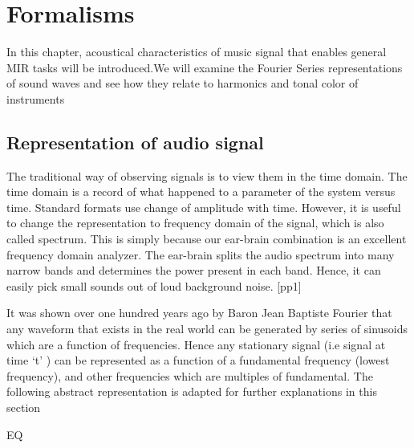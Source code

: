 
\chapter{Formalisms} %

\label{Chapter2} %



In this chapter, acoustical characteristics of music signal that enables general MIR tasks will be introduced.We will examine the Fourier Series representations of sound waves and see how they relate to harmonics and tonal color of instruments  




\section{Representation of audio signal}
The traditional way of observing signals is to view them in the time domain. The time domain is a record of what happened to a parameter of the system versus time. Standard formats use change of amplitude with time. However, it is useful to change the representation to frequency domain of the signal, which is also called spectrum. This is simply because our ear-brain combination is an excellent frequency domain analyzer. The ear-brain splits the audio spectrum into many narrow bands and determines the power present in each band. Hence, it can easily pick small sounds out of loud background noise. [pp1]
 
It was shown over one hundred years ago by Baron Jean Baptiste Fourier that any waveform that exists in the real world can be generated by series of sinusoids which are a function of frequencies. Hence any stationary signal  (i.e signal at time ‘t’ ) can be represented as a function of a fundamental frequency (lowest frequency), and other frequencies which are multiples of fundamental. The following abstract representation is adapted for further explanations in this section

EQ


